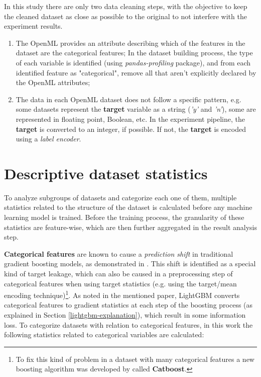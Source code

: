 In this study there are only two data cleaning steps, with the objective to keep the cleaned dataset as close as possible to the original to not interfere with the experiment results.
\begin{enumerate}
    \item The OpenML provides an attribute describing which of the features in the dataset are the categorical features; In the dataset building process, the type of each variable is identified (using \textit{pandas-profiling} package), and from each identified feature as "categorical", remove all that aren't explicitly declared by the OpenML attributes;
    \item The data in each OpenML dataset does not follow a specific pattern, e.g. some datasets represent the \textbf{target} variable as a string (\textit{'y'} and \textit{'n'}), some are represented in floating point, Boolean, etc. In the experiment pipeline, the \textbf{target} is converted to an integer, if possible. If not, the \textbf{target} is encoded using a \textit{label encoder}.
\end{enumerate}

\section{Descriptive dataset statistics}
\label{dataset-aggregated-statistics}

To analyze subgroups of datasets and categorize each one of them, multiple statistics related to the structure of the dataset is calculated before any machine learning model is trained. Before the training process, the granularity of these statistics are feature-wise, which are then further aggregated in the result analysis step.

\textbf{Categorical features} are known to cause a \textit{prediction shift} in traditional gradient boosting models, as demonstrated in \cite{prokhorenkova2018catboost}. This shift is identified as a special kind of target leakage, which can also be caused in a preprocessing step of categorical features when using target statistics (e.g. using the target/mean encoding technique)\footnote{To fix this kind of problem in a dataset with many categorical features a new boosting algorithm was developed by \cite{dorogush2018catboost} called \textbf{Catboost}.}. As noted in the mentioned paper, LightGBM converts categorical features to gradient statistics at each step of the boosting process (as explained in Section \ref{lightgbm-explanation}), which result in some information loss. To categorize datasets with relation to categorical features, in this work the following statistics related to categorical variables are calculated:

